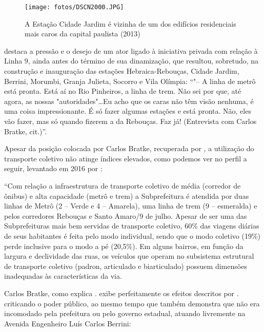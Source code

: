 	\begin{figure}[h]
		\caption{A Estação Cidade Jardim é vizinha de um dos edifícios residenciais mais caros da capital paulista (2013)\cite{apecaro}}
		\texttt{[image: fotos/DSCN2000.JPG]}
	\end{figure}	
	
	 destaca a pressão e o desejo de um ator ligado à iniciativa privada com relação à Linha 9, ainda antes do término de sua dinamização, que resultou, sobretudo, na construção e inauguração das estações Hebraica-Rebouças, Cidade Jardim, Berrini, Morumbi, Granja Julieta, Socorro e Vila Olímpia\cite[pág. 38]{Ferreira}: ``"-- A linha de metrô está pronta. Está aí no Rio Pinheiros, a linha de trem. Não sei por que, até agora, as nossas "autoridades"\dots Eu acho que os caras não têm visão nenhuma, é uma coisa impressionante. É só fazer algumas estações e está pronta. Não, eles vão fazer, mas só quando fizerem a da Rebouças. Faz já! (Entrevista com Carlos Bratke, cit.)''.
	
	Apesar da posição colocada por Carlos Bratke, recuperada por , a utilização do transporte coletivo não atinge índices elevados, como podemos ver no perfil a seguir, levantado em 2016 por :
	
	\begin{citacao}
		“Com relação a infraestrutura de transporte coletivo de média (corredor de ônibus) e alta capacidade (metrô e trem) a Subprefeitura é atendida por duas linhas de Metrô (2 – Verde e 4 – Amarela), uma linha de trem (9 – esmeralda) e pelos corredores Rebouças e Santo Amaro/9 de julho. Apesar de ser uma das Subprefeituras mais bem servidas de transporte coletivo, 60\% das viagens diárias de seus habitantes é feita pelo modo individual, sendo que o modo coletivo (19\%) perde inclusive para o modo a pé (20,5\%). Em alguns bairros, em função da largura e declividade das ruas, os veículos que operam no subsistema estrutural de transporte coletivo (padron, articulado e biarticulado) possuem dimensões inadequadas às características da via.
	\end{citacao}
	
	Carlos Bratke, como explica . exibe perfeitamente os efeitos descritos por . criticando o poder público, ao mesmo tempo que também demonstra que não era incomodado pela prefeitura ou pelo governo estadual, atuando livremente na Avenida Engenheiro Luís Carlos Berrini:
	
